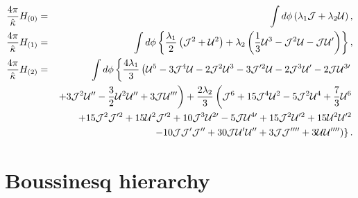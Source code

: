\documentclass[letterpaper,11pt,oneside]{book}
\begin{document}
\begin{eqnarray*}
	\frac{4\pi}{\hat{\kappa}}H_{\left(0\right)} & = & \int d\phi\left(\lambda_{1}\mathcal{J}+\lambda_{2}\mathcal{U}\right),\\
	\frac{4\pi}{\hat{\kappa}}H_{\left(1\right)} & = & \int d\phi\left\{ \frac{\lambda_{1}}{2}\left(\mathcal{J}^{2}+\mathcal{U}^{2}\right)+\lambda_{2}\left(\frac{1}{3}\mathcal{U}^{3}-\mathcal{J}^{2}\mathcal{U}-\mathcal{J}\mathcal{U}^{\prime}\right)\right\} ,\\
	\frac{4\pi}{\hat{\kappa}}H_{\left(2\right)} & = & \int d\phi\left\{ \frac{4\lambda_{1}}{3}\left(\mathcal{U}^{5}-3\mathcal{J}^{4}\mathcal{U}-2\mathcal{J}^{2}\mathcal{U}^{3}-3\mathcal{J}^{\prime2}\mathcal{U}-2\mathcal{J}^{3}\mathcal{U}^{\prime}-2\mathcal{J}\mathcal{U}^{3\prime}\right.\right.\\
	{\color{red}} & {\color{red}} & \left.+3\mathcal{J}^{2}\mathcal{U}^{\prime\prime}-\frac{3}{2}\mathcal{U}^{2}\mathcal{U}^{\prime\prime}+3\mathcal{J}\mathcal{U}^{\prime\prime\prime}\right)+\frac{2\lambda_{2}}{3}\left(\mathcal{J}^{6}+15\mathcal{J}^{4}\mathcal{U}^{2}-5\mathcal{J}^{2}\mathcal{U}^{4}+\frac{7}{3}\mathcal{U}^{6}\right.\\
	&  & \left.+15\mathcal{J}^{2}\mathcal{J}^{\prime2}+15\mathcal{U}^{2}\mathcal{J}^{\prime2}+10\mathcal{J}^{3}\mathcal{U}^{2\prime}-5\mathcal{J}\mathcal{U}^{4\prime}+15\mathcal{J}^{2}\mathcal{U}^{\prime2}+15\mathcal{U}^{2}\mathcal{U}^{\prime2}\right.\\
	&  & \left.\left.-10\mathcal{J}\mathcal{J}^{\prime}\mathcal{J}^{\prime\prime}+30\mathcal{J}\mathcal{U}^{\prime}\mathcal{U}^{\prime\prime}+3\mathcal{J}\mathcal{J}^{\prime\prime\prime\prime}+3\mathcal{U}\mathcal{U}^{\prime\prime\prime\prime}\right)\right\} .
\end{eqnarray*}


\chapter{Boussinesq hierarchy\label{Appendix 5: Bsq and mBsq}}
\end{document}
